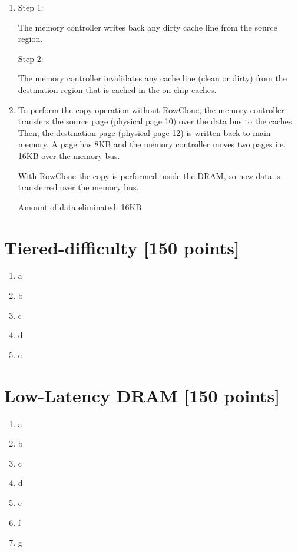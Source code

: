 \documentclass[a4paper]{article}
\begin{document}
\begin{enumerate}[label=\alph*)]
    \item 
        Step 1: 

        The memory controller writes back any dirty cache line from
        the source region.

        Step 2: 

        The memory controller invalidates any cache line (clean or
        dirty) from the destination region that is cached in the on-chip caches.

    \item To perform the copy operation without RowClone, the memory controller
        transfers the source page (physical page 10) over the data bus to the
        caches. Then, the destination page (physical page 12) is written back
        to main memory. A page has 8KB and the memory controller moves two 
        pages i.e. 16KB over the memory bus.

        With RowClone the copy is performed inside the DRAM, so now data is
        transferred over the memory bus.

        Amount of data eliminated: 16KB
\end{enumerate}

\section{Tiered-difficulty [150 points]}

\begin{enumerate}[label=\alph*)]
    \item a
    \item b
    \item c
    \item d
    \item e
\end{enumerate}

\section{Low-Latency DRAM [150 points]}

\begin{enumerate}[label=\alph*)]
    \item a
    \item b
    \item c
    \item d
    \item e
    \item f
    \item g
\end{enumerate}
\end{document}

